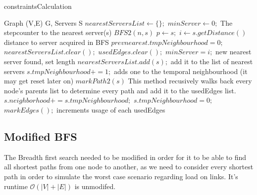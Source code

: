 \documentclass [12pt]{article}
\begin{document}
    \begin{algorithm}[H]
        \caption{constraintsCalculation}
        \begin{algorithmic}[2]
            \Require Graph (V,E) G, Servers S
                    \State $nearestServersList \gets \{\};$ 
                    \State $minServer \gets 0;$ \Comment The stepcounter to the nearest server(s)
                        \State $BFS2(n,s)$
                        \State $p \gets s;$
                        \State $i \gets s.getDistance() $ \Comment distance to server acquired in BFS 
                                    \State $prevnearest.tmpNeighbourhood=0;$
                                    \State $nearestServersList.clear();$
                                    \State $usedEdges.clear();$
                                \EndFor
                            \EndIf
                            \State $minServer = i;$ \Comment new nearest server found, set length
                            \State $nearestServersList.add(s);$ \Comment add it to the list of nearest servers 
                            \State $s.tmpNeighbourhood += 1;$ \Comment adds one to the temporal neighbourhood (it may get reset later on)
                            \State $markPath2(s)$ \Comment This method recusively walks back every node's parents list to determine every path and add it to the usedEdges list.
                        \EndIf 
                    \EndFor
                            \State $s.neighborhood += s.tmpNeighbourhood;$
                            \State $s.tmpNeighbourhood = 0;$
                        \EndFor
                    \State $markEdges();$ \Comment increments usage of each usedEdges
                \EndIf
            \EndFor
        \end{algorithmic}
    \end{algorithm}
    \subsection{Modified BFS}
    The Breadth first search needed to be modified in order for it to be able to find all shortest paths
    from one node to another, as we need to consider every shortest path in order to simulate
    the worst case scenario regarding load on links. It's runtime $\mathcal O(|V| + |E|)$ is unmodifed.
\end{document}

